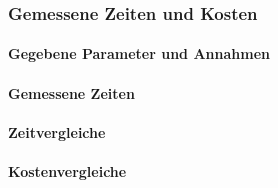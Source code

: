 
\begin{flushleft}
    \subsubsection{Gemessene Zeiten und Kosten}
    \paragraph{Gegebene Parameter und Annahmen}
    \paragraph{Gemessene Zeiten}
    \paragraph{Zeitvergleiche}
    \paragraph{Kostenvergleiche}
\end{flushleft}
